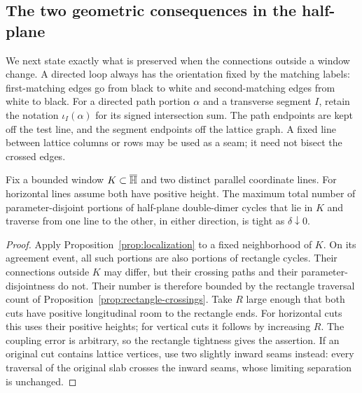 \subsection{The two geometric consequences in the half-plane}

We next state exactly what is preserved when the connections outside a
window change.  A directed loop always has the orientation fixed by the
matching labels: first-matching edges go from black to white and
second-matching edges from white to black.  For a directed path portion
$\alpha$ and a transverse segment $I$, retain the notation $\iota_I(\alpha)$ for its
signed intersection sum.  The path endpoints are kept off the test
line, and the segment endpoints off the lattice graph.  A fixed line
between lattice columns or rows may be used as a seam; it need not
bisect the crossed edges.

\begin{corollary}
\label{cor:local-crossings}
Fix a bounded window $K\subset\overline{\mathbb H}$ and two distinct parallel
coordinate lines.  For horizontal lines assume both have positive
height.  The maximum total number of parameter-disjoint portions of
half-plane double-dimer cycles that lie in $K$ and traverse from one
line to the other, in either direction, is tight as $\delta\downarrow0$.
\end{corollary}

\begin{proof}
Apply Proposition~\ref{prop:localization} to a fixed neighborhood of
$K$.  On its agreement event, all such portions are also portions of
rectangle cycles.  Their connections
outside $K$ may differ, but their crossing paths and their
parameter-disjointness do not.  Their number is therefore bounded by
the rectangle traversal count of
Proposition~\ref{prop:rectangle-crossings}.  Take $R$ large enough that
both cuts have positive longitudinal room to the rectangle ends.
For horizontal cuts this uses their positive heights; for vertical
cuts it follows by increasing $R$.  The coupling error is arbitrary,
so the rectangle tightness gives the assertion.  If an original cut
contains lattice vertices, use two slightly inward seams instead:
every traversal of the original slab crosses the inward seams, whose
limiting separation is unchanged.
\end{proof}

